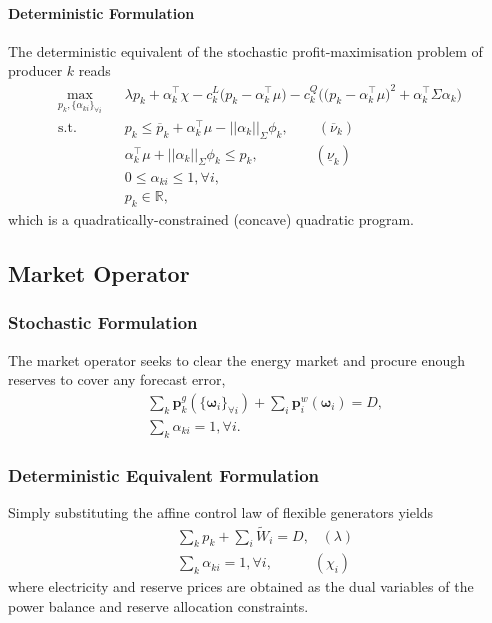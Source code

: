 \documentclass{article}
\begin{document}
\paragraph{Deterministic Formulation} The deterministic equivalent of the stochastic profit-maximisation problem of producer $k$ reads
\begin{align}
\underset{p_k, \{\alpha_{ki}\}_{\forall i}}{\max} \hspace{10pt} & \lambda p_k + \alpha_k^\top \chi - c_k^L\big(p_k - \alpha_k^\top \mu\big) - c_k^Q \Big(\big(p_k - \alpha_{k}^\top \mu \big)^2 + \alpha_k^\top \Sigma \alpha_k\Big)\\
\mbox{s.t. } & p_k \le \overline{p}_k + \alpha_k^\top \mu - ||\alpha_k||_{\Sigma} \phi_k, \hspace{25pt} (\overline{\nu}_k)\\
& \alpha_k^\top \mu + ||\alpha_k||_{\Sigma} \phi_k \le p_k, \hspace{48pt}(\underline{\nu}_k)\\
& 0 \le \alpha_{ki} \le 1, \forall i,\\
&p_k \in \mathbb{R},
\end{align}
which is a quadratically-constrained (concave) quadratic program.
\subsection{Market Operator}

\subsubsection{Stochastic Formulation}

The market operator seeks to clear the energy market and procure enough reserves to cover any forecast error,
\begin{align}
& \sum_k \mathbf{p}_k^g(\{\boldsymbol{\omega}_i\}_{\forall i}) + \sum_i \mathbf{p}_i^w(\boldsymbol{\omega}_i) = D,\\
& \sum_{k} \alpha_{ki} = 1, \forall i.
\end{align}

\subsubsection{Deterministic Equivalent Formulation}

Simply substituting the affine control law of flexible generators yields
\begin{align}
& \sum_k p_k + \sum_i \tilde{W}_i = D, \hspace{10pt} (\lambda)\\
& \sum_k \alpha_{ki} = 1, \forall i, \hspace{35pt} (\chi_i)
\end{align}
where electricity and reserve prices are obtained as the dual variables of the power balance and reserve allocation constraints.
\end{document}
